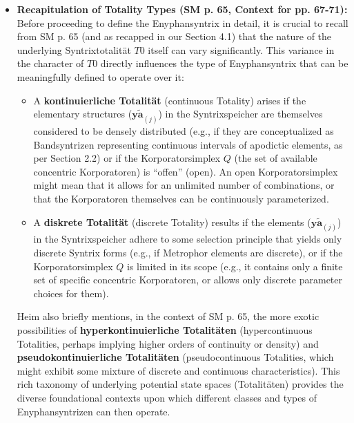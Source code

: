 \documentclass[12pt]{article}
\newcommand{\q}[1]{\enquote{#1}}
\newcommand{\elementarstruktur}{\bm{y\widetilde{a}}_{(j)}}
\newcommand{\syntrixtotalitaet}{T0}
\begin{document}
\begin{itemize}
    \item \textbf{Recapitulation of Totality Types (SM p. 65, Context for pp. 67-71):}
    Before proceeding to define the Enyphansyntrix in detail, it is crucial to recall from SM p. 65 (and as recapped in our Section 4.1) that the nature of the underlying Syntrixtotalität \( \syntrixtotalitaet \) itself can vary significantly. This variance in the character of \( \syntrixtotalitaet \) directly influences the type of Enyphansyntrix that can be meaningfully defined to operate over it:
    \begin{itemize}
        \item A \textbf{kontinuierliche Totalität} (continuous Totality) arises if the elementary structures (\( \elementarstruktur \)) in the Syntrixspeicher are themselves considered to be densely distributed (e.g., if they are conceptualized as Bandsyntrizen representing continuous intervals of apodictic elements, as per Section 2.2) or if the Korporatorsimplex \( Q \) (the set of available concentric Korporatoren) is \q{offen} (open). An open Korporatorsimplex might mean that it allows for an unlimited number of combinations, or that the Korporatoren themselves can be continuously parameterized.
        \item A \textbf{diskrete Totalität} (discrete Totality) results if the elements (\( \elementarstruktur \)) in the Syntrixspeicher adhere to some selection principle that yields only discrete Syntrix forms (e.g., if Metrophor elements are discrete), or if the Korporatorsimplex \( Q \) is limited in its scope (e.g., it contains only a finite set of specific concentric Korporatoren, or allows only discrete parameter choices for them).
    \end{itemize}
    Heim also briefly mentions, in the context of SM p. 65, the more exotic possibilities of \textbf{hyperkontinuierliche Totalitäten} (hypercontinuous Totalities, perhaps implying higher orders of continuity or density) and \textbf{pseudokontinuierliche Totalitäten} (pseudocontinuous Totalities, which might exhibit some mixture of discrete and continuous characteristics). This rich taxonomy of underlying potential state spaces (Totalitäten) provides the diverse foundational contexts upon which different classes and types of Enyphansyntrizen can then operate.


\end{itemize}
\end{document}
